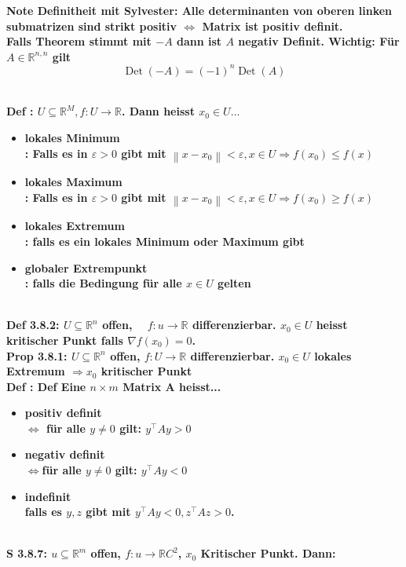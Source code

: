 \documentclass[7pt,landscape, margin = 0.1mm]{article}
\newcommand{\COL}[1]{ \color{chaptercolor} \bf{#1}\color{black}     \\}
\newcommand{\DEF}[2]{\color{chaptercolor}\bf{Def #1}:\color{black}    \hspace{0.2cm} #2 \\}
\newcommand{\NOTE}[2]{\color{chaptercolor}\bf{Note #1}:\color{black}    \hspace{0.2cm} #2 \\}
\newcommand{\PROP}[2]{\color{chaptercolor}\bf{Prop #1}:\color{black}    \hspace{0.2cm} #2 \\}
\newcommand{\SA}[2]{\color{chaptercolor}\bf{S #1}:\color{black}    \hspace{0.2cm} #2 \\}
\begin{document}
\begin{multicols}{4}
\begin{flushleft}
\NOTE{Definitheit mit Sylvester}{
Alle determinanten von oberen linken submatrizen sind strikt positiv $\Leftrightarrow$ Matrix ist positiv definit. \\
Falls Theorem stimmt mit $-A$ dann ist $A$ negativ Definit. Wichtig: Für $A \in \mathbb{R}^{n,n}$ gilt $$\operatorname{Det}(-A) =  (-1)^{n}\operatorname{Det}(A)$$ 

}

\DEF{}{$U \subseteq \mathbb{R}^M, f: U \rightarrow \mathbb{R}$. Dann heisst $x_0 \in U \ldots$

\begin{itemize}

 \item \COL{lokales Minimum} : Falls es in $\varepsilon>0$ gibt mit $\left\|x-x_0\right\|<\varepsilon, x \in U \Rightarrow f\left(x_0\right) \leqslant f(x)$
 \item \COL{lokales Maximum} : Falls es in $\varepsilon>0$ gibt mit $\left\|x-x_0\right\|<\varepsilon, x \in U \Rightarrow f\left(x_0\right) \geqslant f(x)$
\item  \COL{lokales Extremum} : falls es ein lokales Minimum oder Maximum gibt
\item \COL{globaler Extrempunkt} : falls die Bedingung für alle $x \in U$ gelten
\end{itemize}

}

\DEF{3.8.2}{$U \subseteq \mathbb{R}^n$ offen, $\quad f: u \rightarrow \mathbb{R}$ differenzierbar. $x_0 \in U$ heisst kritischer Punkt falls $\nabla f\left(x_0\right)=0$.}

\PROP{3.8.1}{$U \subseteq \mathbb{R}^n$ offen, $f: U \rightarrow \mathbb{R}$ differenzierbar.
$x_0 \in U$ lokales Extremum $\Rightarrow x_0$ kritischer Punkt}

\DEF{}{Def Eine $n \times m$ Matrix A heisst...

\begin{itemize}


\item \COL{positiv definit} $\Leftrightarrow$ für alle $y \neq 0$ gilt: $y^{\top} A y>0$
\item \COL{negativ definit} $\Leftrightarrow$für alle $y \neq 0$ gilt: $y^{\top} A y<0$
 \item \COL{indefinit} falls es $y, z$ gibt mit $y^{\top} A y<0, z^{\top} A z>0$.
 \end{itemize}}
 
 \SA{3.8.7}{$u \subseteq \mathbb{R}^m$ offen, $f: u \rightarrow \mathbb{R} C^2$, $x_0$ Kritischer Punkt. Dann:
 \begin{itemize}
 


\end{itemize}}
\end{flushleft}
\end{multicols}
\end{document}
